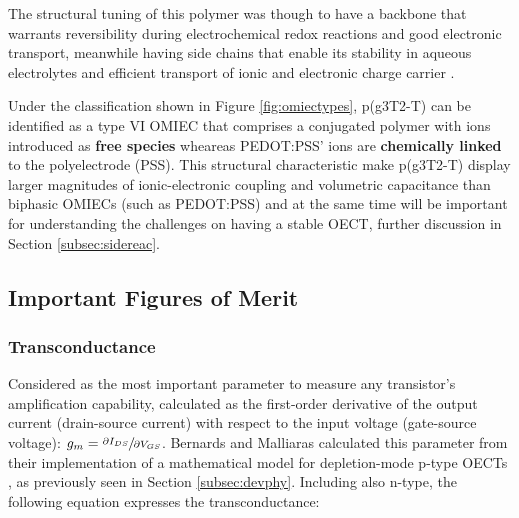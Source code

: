 The structural tuning of this polymer was though to have a backbone that warrants reversibility during electrochemical redox reactions and good electronic transport, meanwhile having side chains that enable its stability in aqueous electrolytes and efficient transport of ionic and electronic charge carrier \cite{moiaDesignEvaluationConjugated2019}. 



Under the classification shown in Figure \ref{fig:omiectypes}, p(g3T2-T) can be identified as a type VI OMIEC that comprises a conjugated polymer with ions introduced as \textbf{free species} wheareas PEDOT:PSS' ions are \textbf{chemically linked} to the polyelectrode (PSS). This structural characteristic make p(g3T2-T) display larger magnitudes of ionic-electronic coupling and volumetric capacitance than biphasic OMIECs (such as PEDOT:PSS) \cite{paulsenOrganicMixedIonic2020} and at the same time will be important for understanding the challenges on having a stable OECT, further discussion in Section \ref{subsec:sidereac}.


\subsection{Important Figures of Merit}

\subsubsection{Transconductance}
Considered as the most important parameter to measure any transistor's amplification capability, calculated as the first-order derivative of the output current (drain-source current) with respect to the input voltage (gate-source voltage): $g_{m} = \sfrac{\partial I_{DS}}{\partial V_{GS}}$. Bernards and Malliaras calculated this parameter from their implementation of a mathematical model for depletion-mode p-type OECTs \cite{bernardsSteadyStateTransientBehavior2007}, as previously seen in Section \ref{subsec:devphy}. Including also n-type, the following equation expresses the transconductance: %


